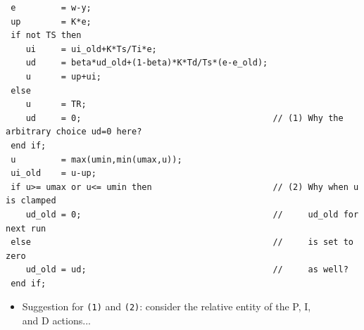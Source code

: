 \begin{frame}[fragile]
\myPause
 {\scriptsize
 \begin{verbatim}
 e         = w-y;
 up        = K*e;
 if not TS then
    ui     = ui_old+K*Ts/Ti*e;
    ud     = beta*ud_old+(1-beta)*K*Td/Ts*(e-e_old);
    u      = up+ui;
 else
    u      = TR;
    ud     = 0;                                      // (1) Why the arbitrary choice ud=0 here?
 end if;
 u         = max(umin,min(umax,u));
 ui_old    = u-up;
 if u>= umax or u<= umin then                        // (2) Why when u is clamped
    ud_old = 0;                                      //     ud_old for next run
 else                                                //     is set to zero
    ud_old = ud;                                     //     as well?
 end if;
 \end{verbatim}
 }\myPause
 \vspace{-6mm}\begin{itemize}[<+-| alert@+>]
 \item Suggestion for \texttt{(1)} and \texttt{(2)}: consider the relative entity of the P, I,\\
       and D actions...
 \end{itemize}
\end{frame}

